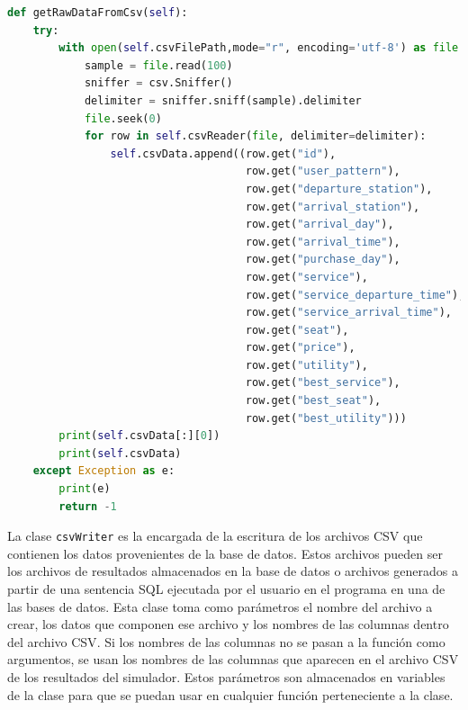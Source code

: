 \begin{lstlisting}[language=Python,
                   style=python,
                   frame=none,
                   numbers=none,
                   basicstyle=\ttfamily\normalsize,
                   caption={Función \texttt{getRawDataFromCsv}},
                   label=src:functionGetRawDataFromCsv,
                   inputencoding=utf8]                   
def getRawDataFromCsv(self):
    try:
        with open(self.csvFilePath,mode="r", encoding='utf-8') as file:
            sample = file.read(100)
            sniffer = csv.Sniffer()
            delimiter = sniffer.sniff(sample).delimiter
            file.seek(0)
            for row in self.csvReader(file, delimiter=delimiter):
                self.csvData.append((row.get("id"),
                                     row.get("user_pattern"),
                                     row.get("departure_station"),
                                     row.get("arrival_station"),
                                     row.get("arrival_day"),
                                     row.get("arrival_time"),
                                     row.get("purchase_day"),
                                     row.get("service"),
                                     row.get("service_departure_time"),
                                     row.get("service_arrival_time"),
                                     row.get("seat"),
                                     row.get("price"),
                                     row.get("utility"),
                                     row.get("best_service"),
                                     row.get("best_seat"),
                                     row.get("best_utility")))
        print(self.csvData[:][0])
        print(self.csvData)
    except Exception as e:
        print(e)
        return -1
\end{lstlisting}

La clase \texttt{csvWriter} es la encargada de la escritura de los archivos \acrshort{CSV} que contienen los datos provenientes de la base de datos. Estos archivos pueden ser los archivos de resultados almacenados en la base de datos o archivos generados a partir de una sentencia \acrshort{SQL} ejecutada por el usuario en el programa en una de las bases de datos. Esta clase toma como parámetros el nombre del archivo a crear, los datos que componen ese archivo y los nombres de las columnas dentro del archivo \acrshort{CSV}. Si los nombres de las columnas no se pasan a la función como argumentos, se usan los nombres de las columnas que aparecen en el archivo \acrshort{CSV} de los resultados del simulador. Estos parámetros son almacenados en variables de la clase para que se puedan usar en cualquier función perteneciente a la clase. 

